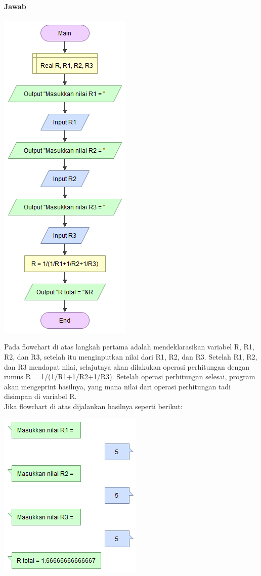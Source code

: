\documentclass[a4paper,12pt]{article}
\begin{document}
\paragraph{Jawab}
\begin{center}
    \includegraphics[height=.6\textheight]{praktik1 - Main.png}
\end{center}
Pada flowchart di atas langkah pertama adalah mendeklarasikan variabel R, R1, R2, dan R3, setelah itu menginputkan nilai dari R1, R2, dan R3. Setelah R1, R2, dan R3 mendapat nilai, selajutnya 
akan dilakukan operasi perhitungan dengan rumus R = 1/(1/R1+1/R2+1/R3). Setelah operasi perhitungan selesai, program akan mengeprint hasilnya, yang mana nilai dari operasi perhitungan tadi disimpan di variabel R.\\
Jika flowchart di atas dijalankan hasilnya seperti berikut:
\begin{center}
    \includegraphics[scale = 1]{main1.PNG}
\end{center}
\end{document}
